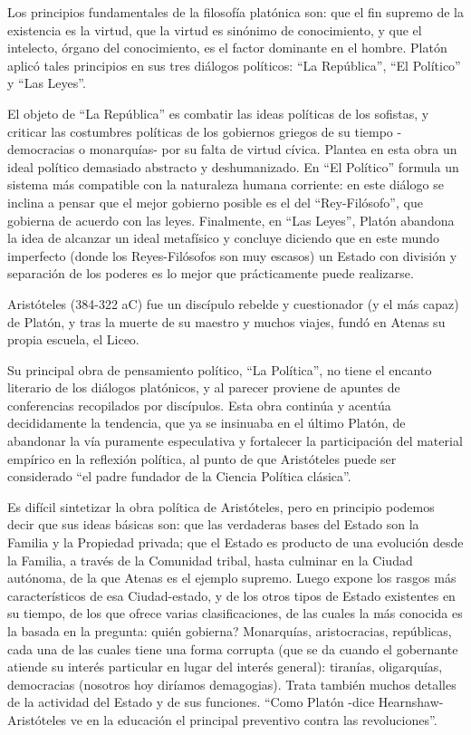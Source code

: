 \documentclass[
]{book}
\begin{document}
Los principios fundamentales de la filosofía platónica son: que el fin supremo de la existencia es la virtud, que la virtud es sinónimo de conocimiento, y que el intelecto, órgano del conocimiento, es el factor dominante en el hombre. Platón aplicó tales principios en sus tres diálogos políticos: ``La República'', ``El Político'' y ``Las Leyes''.

El objeto de ``La República'' es combatir las ideas políticas de los sofistas, y criticar las costumbres políticas de los gobiernos griegos de su tiempo -democracias o monarquías- por su falta de virtud cívica. Plantea en esta obra un ideal político demasiado abstracto y deshumanizado. En ``El Político'' formula un sistema más compatible con la naturaleza humana corriente: en este diálogo se inclina a pensar que el mejor gobierno posible es el del ``Rey-Filósofo'', que gobierna de acuerdo con las leyes. Finalmente, en ``Las Leyes'', Platón abandona la idea de alcanzar un ideal metafísico y concluye diciendo que en este mundo imperfecto (donde los Reyes-Filósofos son muy escasos) un Estado con división y separación de los poderes es lo mejor que prácticamente puede realizarse.

Aristóteles (384-322 aC) fue un discípulo rebelde y cuestionador (y el más capaz) de Platón, y tras la muerte de su maestro y muchos viajes, fundó en Atenas su propia escuela, el Liceo.

Su principal obra de pensamiento político, ``La Política'', no tiene el encanto literario de los diálogos platónicos, y al parecer proviene de apuntes de conferencias recopilados por discípulos. Esta obra continúa y acentúa decididamente la tendencia, que ya se insinuaba en el último Platón, de abandonar la vía puramente especulativa y fortalecer la participación del material empírico en la reflexión política, al punto de que Aristóteles puede ser considerado ``el padre fundador de la Ciencia Política clásica''.

Es difícil sintetizar la obra política de Aristóteles, pero en principio podemos decir que sus ideas básicas son: que las verdaderas bases del Estado son la Familia y la Propiedad privada; que el Estado es producto de una evolución desde la Familia, a través de la Comunidad tribal, hasta culminar en la Ciudad autónoma, de la que Atenas es el ejemplo supremo. Luego expone los rasgos más característicos de esa Ciudad-estado, y de los otros tipos de Estado existentes en su tiempo, de los que ofrece varias clasificaciones, de las cuales la más conocida es la basada en la pregunta: quién gobierna? Monarquías, aristocracias, repúblicas, cada una de las cuales tiene una forma corrupta (que se da cuando el gobernante atiende su interés particular en lugar del interés general): tiranías, oligarquías, democracias (nosotros hoy diríamos demagogias). Trata también muchos detalles de la actividad del Estado y de sus funciones. ``Como Platón -dice Hearnshaw- Aristóteles ve en la educación el principal preventivo contra las revoluciones''.
\end{document}
